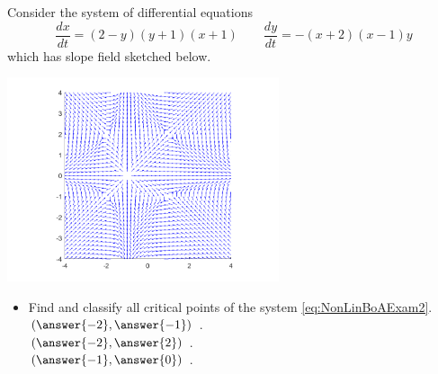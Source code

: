 \documentclass{ximera}
\begin{document}
% 

\begin{exercise} 
    Consider the system of differential equations
    \begin{equation}
        \frac{dx}{dt} = (2-y)(y+1)(x+1) \qquad \frac{dy}{dt} = -(x+2)(x-1)y \label{eq:NonLinBoAExam2}
    \end{equation}
    which has slope field sketched below.
    \begin{center}
        \includegraphics[width=0.6\textwidth]{../figures/NLBoA_Ex2.png}
    \end{center}
    \begin{itemize}
        \item Find and classify all critical points of the system \eqref{eq:NonLinBoAExam2}.\\
            $\left(\answer{-2}, \answer{-1}\right)$  . \\
            $\left(\answer{-2}, \answer{2}\right)$  . \\
            $\left(\answer{-1}, \answer{0}\right)$  . \\

\end{itemize}
\end{exercise}
\end{document}
